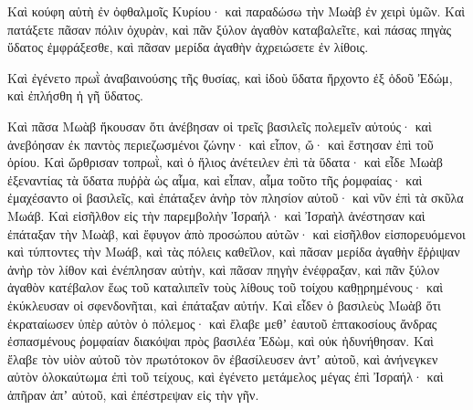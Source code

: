 {Καὶ κούφη αὑτὴ ἐν ὀφθαλμοῖς Κυρίου· καὶ παραδώσω τὴν Μωὰβ ἐν χειρὶ ὑμῶν.
Καὶ πατάξετε πᾶσαν πόλιν ὀχυρὰν, καὶ πᾶν ξύλον ἀγαθὸν καταβαλεῖτε, καὶ πάσας πηγὰς ὕδατος ἐμφράξεσθε, καὶ πᾶσαν μερίδα ἀγαθὴν ἀχρειώσετε ἐν λίθοις.
\par }{\PP {}Καὶ ἐγένετο πρωῒ ἀναβαινούσης τῆς θυσίας, καὶ ἰδοὺ ὕδατα ἤρχοντο ἐξ ὁδοῦ Ἐδώμ, καὶ ἐπλήσθη ἡ γῆ ὕδατος.
\par }{\PP {}Καὶ πᾶσα Μωὰβ ἤκουσαν ὅτι ἀνέβησαν οἱ τρεῖς βασιλεῖς πολεμεῖν αὐτούς· καὶ ἀνεβόησαν ἐκ παντὸς περιεζωσμένοι ζώνην· καὶ εἶπον, ὤ· καὶ ἔστησαν ἐπὶ τοῦ ὁρίου.
Καὶ ὤρθρισαν τοπρωῒ, καὶ ὁ ἥλιος ἀνέτειλεν ἐπὶ τὰ ὕδατα· καὶ εἶδε Μωὰβ ἐξεναντίας τὰ ὕδατα πυῤῥὰ ὡς αἷμα,
καὶ εἶπαν, αἷμα τοῦτο τῆς ῥομφαίας· καὶ ἐμαχέσαντο οἱ βασιλεῖς, καὶ ἐπάταξεν ἀνὴρ τὸν πλησίον αὐτοῦ· καὶ νῦν ἐπὶ τὰ σκῦλα Μωάβ.
Καὶ εἰσῆλθον εἰς τὴν παρεμβολὴν Ἰσραήλ· καὶ Ἰσραὴλ ἀνέστησαν καὶ ἐπάταξαν τὴν Μωὰβ, καὶ ἔφυγον ἀπὸ προσώπου αὐτῶν· καὶ εἰσῆλθον εἰσπορευόμενοι καὶ τύπτοντες τὴν Μωάβ,
καὶ τὰς πόλεις καθεῖλον, καὶ πᾶσαν μερίδα ἀγαθὴν ἔῤῥιψαν ἀνὴρ τὸν λίθον καὶ ἐνέπλησαν αὐτὴν, καὶ πᾶσαν πηγὴν ἐνέφραξαν, καὶ πᾶν ξύλον ἀγαθὸν κατέβαλον ἕως τοῦ καταλιπεῖν τοὺς λίθους τοῦ τοίχου καθῃρημένους· καὶ ἐκύκλευσαν οἱ σφενδονῆται, καὶ ἐπάταξαν αὐτήν.
Καὶ εἶδεν ὁ βασιλεὺς Μωὰβ ὅτι ἐκραταίωσεν ὑπὲρ αὐτὸν ὁ πόλεμος· καὶ ἔλαβε μεθʼ ἑαυτοῦ ἑπτακοσίους ἄνδρας ἐσπασμένους ῥομφαίαν διακόψαι πρὸς βασιλέα Ἐδὼμ, καὶ οὐκ ἠδυνήθησαν.
Καὶ ἔλαβε τὸν υἱὸν αὐτοῦ τὸν πρωτότοκον ὃν ἐβασίλευσεν ἀντʼ αὐτοῦ, καὶ ἀνήνεγκεν αὐτὸν ὁλοκαύτωμα ἐπὶ τοῦ τείχους, καὶ ἐγένετο μετάμελος μέγας ἐπὶ Ἰσραήλ· καὶ ἀπῆραν ἀπʼ αὐτοῦ, καὶ ἐπέστρεψαν εἰς τὴν γῆν.

}
